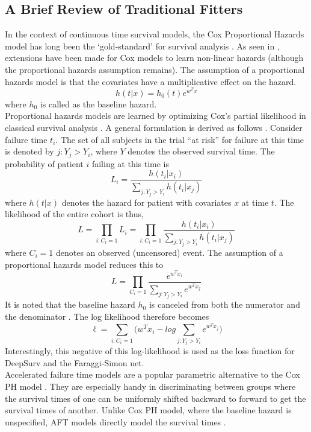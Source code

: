\documentclass[%
 reprint,
 amsmath,amssymb,
 aps,nofootinbib
]{revtex4-2}
\begin{document}
\subsection{\label{trad_fits}A Brief Review of Traditional Fitters}
In the context of continuous time survival models, the Cox Proportional Hazards model has long been the `gold-standard' for survival analysis \cite{cph}. As seen in \cite{deepsurv}, extensions have been made for Cox models to learn non-linear hazards (although the proportional hazards assumption remains). The assumption of a proportional hazards model is that the covariates have a multiplicative effect on the hazard.
\[
h(t|x) = h_0(t)e^{w^Tx}
\]
where $h_0$ is called as the baseline hazard.\\

Proportional hazards models are learned by optimizing Cox’s partial likelihood in classical survival analysis \cite{raykar_cindex}. A general formulation is derived as follows \cite{Moore_2016}. Consider failure time $t_i$. The set of all subjects in the trial “at risk” for failure at this time is denoted by $j:Y_j>Y_i$, where $Y$ denotes the observed survival time. The probability of patient $i$ failing at this time is 
\[
L_i = \frac{h(t_i | x_i)}{\sum^{}_{j:Y_j>Y_i}h(t_i|x_j)}
\]
where $h(t|x)$ denotes the hazard for patient with covariates $x$ at time $t$. The likelihood of the entire cohort is thus,
\[
L = \prod^{}_{i:C_i=1}L_i = \prod^{}_{i:C_i=1}\frac{h(t_i | x_i)}{\sum^{}_{j:Y_j>Y_i}h(t_i|x_j)}
\]
where $C_i=1$ denotes an observed (uncensored) event. The assumption of a proportional hazards model reduces this to
\[
L = \prod^{}_{C_i=1}\frac{e^{w^Tx_i}}{\sum^{}_{j:Y_j>Y_i}e^{w^Tx_j}}
\] 
It is noted that the baseline hazard $h_0$ is canceled from both the numerator and the denominator \cite{raykar_cindex}. The log likelihood therefore becomes
\[
\ell = \sum^{}_{i:C_i=1} \Bigg( w^Tx_i - log\sum^{}_{j:Y_j>Y_i}e^{w^Tx_j}\Bigg)
\]
Interestingly, this negative of this log-likelihood is used as the loss function for DeepSurv and the Faraggi-Simon net.\\

Accelerated failure time models are a popular parametric alternative to the Cox PH model \cite{aft}. They are especially handy in discriminating between groups where the survival times of one can be uniformly shifted backward to forward to get the survival times of another. Unlike Cox PH model, where the baseline hazard is unspecified, AFT models directly model the survival times \cite{aft_2009}.\\
\end{document}
